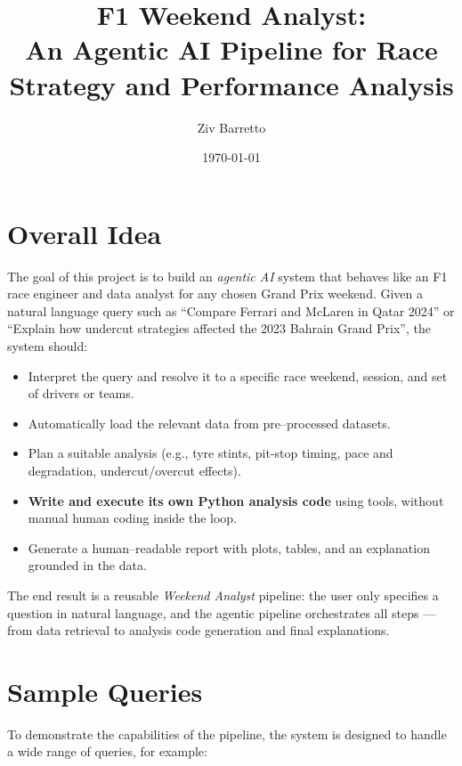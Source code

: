 \documentclass[11pt]{article}
\title{F1 Weekend Analyst:\\An Agentic AI Pipeline for Race Strategy and Performance Analysis}
\author{Ziv Barretto}
\date{\today}
\begin{document}
\maketitle
\tableofcontents
\newpage


\section{Overall Idea}

The goal of this project is to build an \emph{agentic AI} system that behaves like an F1 race engineer and data analyst for any chosen Grand Prix weekend.  
Given a natural language query such as ``Compare Ferrari and McLaren in Qatar 2024'' or ``Explain how undercut strategies affected the 2023 Bahrain Grand Prix'', the system should:

\begin{itemize}[leftmargin=1.5em]
    \item Interpret the query and resolve it to a specific race weekend, session, and set of drivers or teams.
    \item Automatically load the relevant data from pre–processed datasets.
    \item Plan a suitable analysis (e.g., tyre stints, pit-stop timing, pace and degradation, undercut/overcut effects).
    \item \textbf{Write and execute its own Python analysis code} using tools, without manual human coding inside the loop.
    \item Generate a human–readable report with plots, tables, and an explanation grounded in the data.
\end{itemize}

The end result is a reusable \emph{Weekend Analyst} pipeline: the user only specifies a question in natural language, and the agentic pipeline orchestrates all steps --- from data retrieval to analysis code generation and final explanations.

\section{Sample Queries}

To demonstrate the capabilities of the pipeline, the system is designed to handle a wide range of queries, for example:
\end{document}
